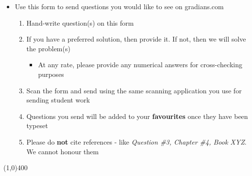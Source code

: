 \documentclass[12pt,a4paper,justified]{tufte-exam}
\begin{document}
  \begin{fullwidth}
    \begin{itemize}
      \item Use this form to send questions you would like to see on gradians.com
      \begin{enumerate}
        \item Hand-write question(s) on this form 
        \item If you have a preferred solution, then provide it. If not, then we will solve the problem(s)
        \begin{itemize}
          \item At any rate, please provide any numerical answers for cross-checking purposes
        \end{itemize}
        \item Scan the form and send using the same scanning application you use for sending student work
        \item Questions you send will be added to your \textbf{favourites} once they have been typeset
        \item Please do \textbf{not} cite references - like \textit{Question \#3, Chapter \#4, Book XYZ}.
              We cannot honour them
      \end{enumerate}
    \end{itemize}
    \line(1,0){400}
  \end{fullwidth}
\end{document}
